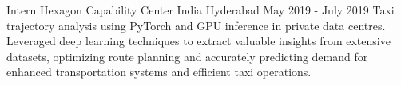 \begin{cventries}
  \cventry
    {Intern} %
    {Hexagon Capability Center India} %
    {Hyderabad} %
    {May 2019 - July 2019} %
    {
      Taxi trajectory analysis using PyTorch and GPU inference in private data centres. Leveraged deep learning techniques to extract valuable insights from extensive datasets, optimizing route planning and accurately predicting demand for enhanced transportation systems and efficient taxi operations.
    }

\end{cventries}

\vspace{-2mm}
